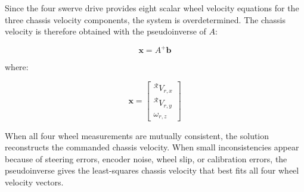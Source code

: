 \documentclass[11pt,a4paper]{article}
\newcommand{\frameR}{\mathcal{R}}
\begin{document}
Since the four swerve drive provides eight scalar wheel velocity equations for
the three chassis velocity components, the system is overdetermined. The
chassis velocity is therefore obtained with the pseudoinverse of \(A\):

\begin{equation}
    \mathbf{x} = A^+\mathbf{b}
\end{equation}

where:

\begin{equation}
    \mathbf{x} =
    \begin{bmatrix}
        {}^{\frameR}V_{r,x} \\
        {}^{\frameR}V_{r,y} \\
        \omega_{r,z}
    \end{bmatrix}
\end{equation}

When all four wheel measurements are mutually consistent, the solution
reconstructs the commanded chassis velocity. When small inconsistencies appear
because of steering errors, encoder noise, wheel slip, or calibration errors,
the pseudoinverse gives the least-squares chassis velocity that best fits all
four wheel velocity vectors.
\end{document}
